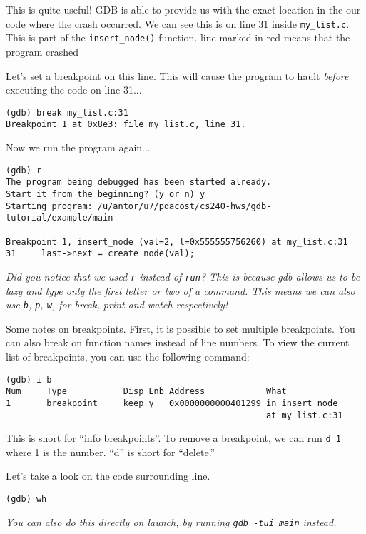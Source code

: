 \documentclass[11pt]{article}
\begin{document}
This is quite useful! GDB is able to provide us with the exact location
in the our code where the crash occurred. We can see this is on line 31
inside {\tt my\_list.c}. This is part of the {\tt insert\_node()} function.
 line marked in red means that the program crashed

Let's set a breakpoint on this line. This will cause the program to hault
\emph{before} executing the code on line 31...

\begin{verbatim}
(gdb) break my_list.c:31
Breakpoint 1 at 0x8e3: file my_list.c, line 31.
\end{verbatim}

Now we run the program again...

\begin{verbatim}
(gdb) r
The program being debugged has been started already.
Start it from the beginning? (y or n) y
Starting program: /u/antor/u7/pdacost/cs240-hws/gdb-tutorial/example/main 

Breakpoint 1, insert_node (val=2, l=0x555555756260) at my_list.c:31
31	   last->next = create_node(val);
\end{verbatim}

\textit{Did you notice that we used {\tt r} instead of {\tt run}? This is
  because gdb allows us to be lazy and type only the first letter or two
  of a command.  This means we can also use {\tt b}, {\tt p},  {\tt w},
  for break, print and watch respectively!}

Some notes on breakpoints. First, it is possible to set multiple breakpoints.
You can also break on function names instead of line numbers. To view
the current list of breakpoints, you can use the following command:

\begin{verbatim}
(gdb) i b
Num     Type           Disp Enb Address            What
1       breakpoint     keep y   0x0000000000401299 in insert_node 
                                                   at my_list.c:31
\end{verbatim}

This is short for ``info breakpoints''. To remove a breakpoint, we can
run {\tt d 1} where 1 is the number. ``d'' is short for ``delete.''

Let's take a look on the code surrounding line.

\begin{verbatim}
(gdb) wh
\end{verbatim}

\textit{You can also do this directly on launch, by running {\tt gdb
-tui main} instead.}
\end{document}
